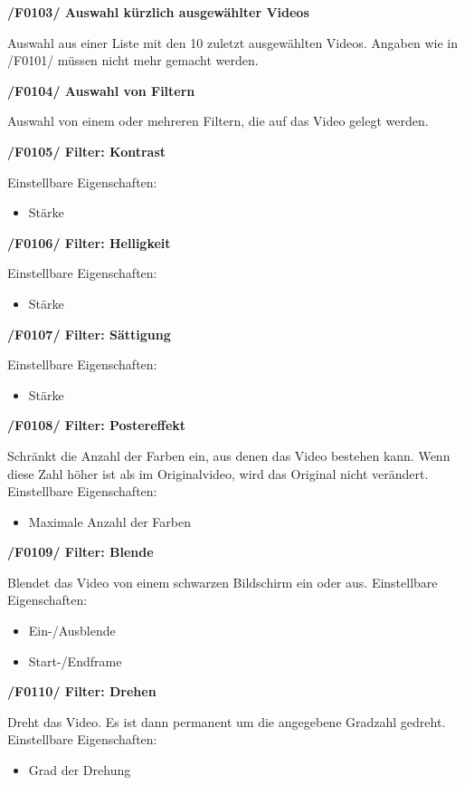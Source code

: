 \documentclass[parskip=full]{scrartcl}
\begin{document}
\textbf{/F0103/ Auswahl kürzlich ausgewählter Videos}

Auswahl aus einer Liste mit den 10 zuletzt ausgewählten Videos. Angaben wie in /F0101/ müssen
nicht mehr gemacht werden.

\textbf{/F0104/ Auswahl von Filtern}

Auswahl von einem oder mehreren Filtern, die auf das Video gelegt werden.

\textbf{/F0105/ Filter: Kontrast}

Einstellbare Eigenschaften:
\begin{itemize}
\item Stärke
\end{itemize}

\textbf{/F0106/ Filter: Helligkeit}

Einstellbare Eigenschaften:
\begin{itemize}
\item Stärke
\end{itemize}

\textbf{/F0107/ Filter: Sättigung}

Einstellbare Eigenschaften:
\begin{itemize}
\item Stärke
\end{itemize}

\textbf{/F0108/ Filter: Postereffekt}

Schränkt die Anzahl der Farben ein, aus denen das Video bestehen kann. Wenn diese Zahl höher ist als im Originalvideo, wird das Original nicht verändert.
Einstellbare Eigenschaften:
\begin{itemize}
\item Maximale Anzahl der Farben
\end{itemize}

\textbf{/F0109/ Filter: Blende}

Blendet das Video von einem schwarzen Bildschirm ein oder aus.
Einstellbare Eigenschaften:
\begin{itemize}
\item Ein-/Ausblende
\item Start-/Endframe
\end{itemize}

\textbf{/F0110/ Filter: Drehen}

Dreht das Video. Es ist dann permanent um die angegebene Gradzahl gedreht.
Einstellbare Eigenschaften:
\begin{itemize}
\item Grad der Drehung
\end{itemize}
\end{document}

